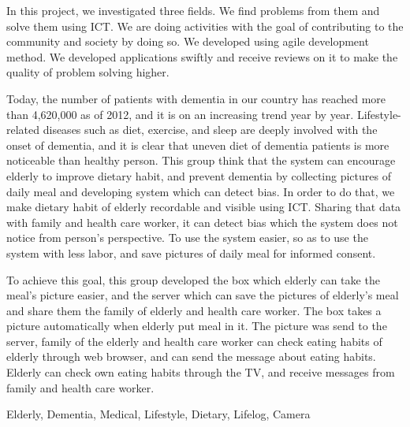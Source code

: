 \documentclass[../report]{subfiles}
\begin{document}
\begin{eabstract}
In this project, we investigated three fields.
We find problems from them and solve them using ICT.
We are doing activities with the goal of contributing to the community and society by doing so.
We developed using agile development method.
We developed applications swiftly and receive reviews on it to make the quality of problem solving higher.

Today, the number of patients with dementia in our country has reached more than 4,620,000 as of 2012, and it is on an increasing trend year by year.
Lifestyle-related diseases such as diet, exercise, and sleep are deeply involved with the onset of dementia, and it is clear that uneven diet of dementia patients is more noticeable than healthy person.
This group think that the system can encourage elderly to improve dietary habit, and prevent dementia by collecting pictures of daily meal and developing system which can detect bias.
In order to do that, we make dietary habit of elderly recordable and visible using ICT.
Sharing that data with family and health care worker, it can detect bias which the system does not notice from person's perspective.
To use the system easier, so as to use the system with less labor, and save pictures of daily meal for informed consent.

To achieve this goal, this group developed the box which elderly can take the meal's picture easier, and the server which can save the pictures of elderly's meal and share them the family of elderly and health care worker.
The box takes a picture automatically when elderly put meal in it.
The picture was send to the server, family of the elderly and health care worker can check eating habits of elderly through web browser, and can send the message about eating habits.
Elderly can check own eating habits through the TV, and receive messages from family and health care worker.

\begin{ekeyword}
Elderly, Dementia, Medical, Lifestyle, Dietary, Lifelog, Camera
\end{ekeyword}
\end{eabstract}
\end{document}
